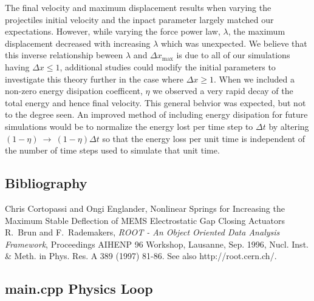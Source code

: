 \documentclass[aps,prl,floatfix,preprint,nofootinbib]{revtex4}
\begin{document}
The final velocity and maximum displacement results when varying the projectiles initial velocity and the inpact parameter largely matched our expectations. However, while varying the force power law, $\lambda$, the maximum displacement decreased with increasing $\lambda$ which was unexpected. We believe that this inverse relationship beween $\lambda$ and $\Delta x_{\text{max}}$ is due to all of our simulations having $\Delta x \leq 1$, additional studies could modify the initial parameters to investigate this theory further in the case where $\Delta x \geq 1$. When we included a non-zero energy disipation coefficent, $\eta$ we observed a very rapid decay of the total energy and hence final velocity. This general behvior was expected, but not to the degree seen. An improved method of including energy disipation for future simulations would be to normalize the energy lost per time step to $\Delta t$ by altering $\left(1-\eta\right)~\rightarrow~\left(1-\eta\right)\Delta t$ so that the energy loss per unit time is independent of the number of time steps used to simulate that unit time. 

\clearpage
\begin{thebibliography}{9}
  \section{Bibliography}
  Chris Cortopassi and Ongi Englander, Nonlinear Springs for Increasing the Maximum Stable Deflection of MEMS Electrostatic Gap Closing Actuators
  R.~Brun and F.~Rademakers, \emph{ROOT - An Object Oriented Data Analysis Framework}, Proceedings AIHENP 96 Workshop, Lausanne, Sep. 1996, Nucl. Inst. \& Meth. in Phys. Res. A 389 (1997) 81-86. See also http://root.cern.ch/.
\end{thebibliography}

\clearpage
\begin{appendices}
  \singlespacing
  \section{main.cpp Physics Loop} \label{sec:main.cpp}

\end{appendices}
\end{document}
